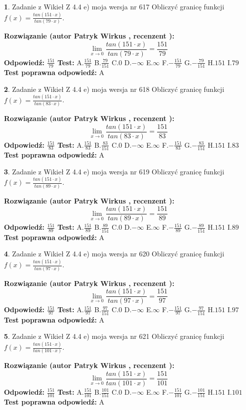 \documentclass[12pt, a4paper]{article}
\theoremstyle{definition} %
\newtheorem{zad}{}
\newcommand{\zadStart}[1]{\begin{zad}#1\newline}
\newcommand{\zadStop}{\end{zad}}
\newcommand{\rozwStart}[2]{\noindent \textbf{Rozwiązanie (autor #1 , recenzent #2): }\newline}
\newcommand{\rozwStop}{\newline}
\newcommand{\odpStart}{\noindent \textbf{Odpowiedź:}\newline}
\newcommand{\odpStop}{\newline}
\newcommand{\testStart}{\noindent \textbf{Test:}\newline}
\newcommand{\testStop}{\newline}
\newcommand{\kluczStart}{\noindent \textbf{Test poprawna odpowiedź:}\newline}
\newcommand{\kluczStop}{\newline}
\begin{document}
\zadStart{Zadanie z Wikieł Z 4.4 e) moja wersja nr 617}
Obliczyć granicę funkcji $f(x)=\frac{tan(151\cdot x)}{tan(79\cdot x)}$.
\zadStop
\rozwStart{Patryk Wirkus}{}
$$\lim\limits_{x\to 0}\frac{tan(151\cdot x)}{tan(79\cdot x)}=
\frac{151}{79}$$
\rozwStop
\odpStart
$\frac{151}{79}$
\odpStop
\testStart
A.$\frac{151}{79}$
B.$\frac{79}{151}$
C.$0$
D.$-\infty$
E.$\infty$
F.$-\frac{151}{79}$
G.$-\frac{79}{151}$
H.$151$
I.$79$
\testStop
\kluczStart
A
\kluczStop



\zadStart{Zadanie z Wikieł Z 4.4 e) moja wersja nr 618}
Obliczyć granicę funkcji $f(x)=\frac{tan(151\cdot x)}{tan(83\cdot x)}$.
\zadStop
\rozwStart{Patryk Wirkus}{}
$$\lim\limits_{x\to 0}\frac{tan(151\cdot x)}{tan(83\cdot x)}=
\frac{151}{83}$$
\rozwStop
\odpStart
$\frac{151}{83}$
\odpStop
\testStart
A.$\frac{151}{83}$
B.$\frac{83}{151}$
C.$0$
D.$-\infty$
E.$\infty$
F.$-\frac{151}{83}$
G.$-\frac{83}{151}$
H.$151$
I.$83$
\testStop
\kluczStart
A
\kluczStop



\zadStart{Zadanie z Wikieł Z 4.4 e) moja wersja nr 619}
Obliczyć granicę funkcji $f(x)=\frac{tan(151\cdot x)}{tan(89\cdot x)}$.
\zadStop
\rozwStart{Patryk Wirkus}{}
$$\lim\limits_{x\to 0}\frac{tan(151\cdot x)}{tan(89\cdot x)}=
\frac{151}{89}$$
\rozwStop
\odpStart
$\frac{151}{89}$
\odpStop
\testStart
A.$\frac{151}{89}$
B.$\frac{89}{151}$
C.$0$
D.$-\infty$
E.$\infty$
F.$-\frac{151}{89}$
G.$-\frac{89}{151}$
H.$151$
I.$89$
\testStop
\kluczStart
A
\kluczStop



\zadStart{Zadanie z Wikieł Z 4.4 e) moja wersja nr 620}
Obliczyć granicę funkcji $f(x)=\frac{tan(151\cdot x)}{tan(97\cdot x)}$.
\zadStop
\rozwStart{Patryk Wirkus}{}
$$\lim\limits_{x\to 0}\frac{tan(151\cdot x)}{tan(97\cdot x)}=
\frac{151}{97}$$
\rozwStop
\odpStart
$\frac{151}{97}$
\odpStop
\testStart
A.$\frac{151}{97}$
B.$\frac{97}{151}$
C.$0$
D.$-\infty$
E.$\infty$
F.$-\frac{151}{97}$
G.$-\frac{97}{151}$
H.$151$
I.$97$
\testStop
\kluczStart
A
\kluczStop



\zadStart{Zadanie z Wikieł Z 4.4 e) moja wersja nr 621}
Obliczyć granicę funkcji $f(x)=\frac{tan(151\cdot x)}{tan(101\cdot x)}$.
\zadStop
\rozwStart{Patryk Wirkus}{}
$$\lim\limits_{x\to 0}\frac{tan(151\cdot x)}{tan(101\cdot x)}=
\frac{151}{101}$$
\rozwStop
\odpStart
$\frac{151}{101}$
\odpStop
\testStart
A.$\frac{151}{101}$
B.$\frac{101}{151}$
C.$0$
D.$-\infty$
E.$\infty$
F.$-\frac{151}{101}$
G.$-\frac{101}{151}$
H.$151$
I.$101$
\testStop
\kluczStart
A
\kluczStop
\end{document}
